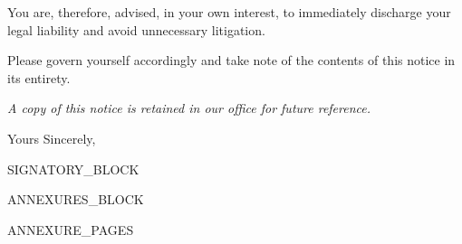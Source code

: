 \documentclass[12pt,a4paper]{article}
\begin{document}
\vspace{4mm}

\noindent
You are, therefore, advised, in your own interest, to immediately discharge your
legal liability and avoid unnecessary litigation.

\vspace{3mm}

\noindent
Please govern yourself accordingly and take note of the contents of this notice
in its entirety.

\vspace{2mm}

\noindent\textit{A copy of this notice is retained in our office for future reference.}

\vspace{6mm}

\noindent Yours Sincerely,

\vspace{14mm}

\noindent
{{SIGNATORY_BLOCK}}

{{ANNEXURES_BLOCK}}

{{ANNEXURE_PAGES}}
\end{document}
